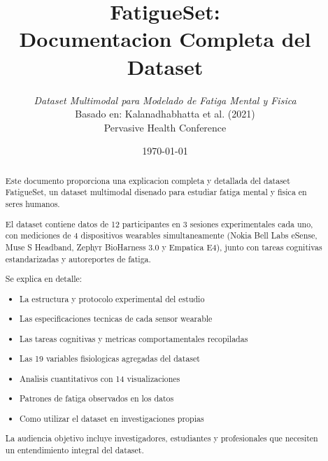 \documentclass[12pt, a4paper, oneside, openany]{report}
\title{\Huge \textbf{FatigueSet:\\Documentacion Completa del Dataset}}
\author{\textit{Dataset Multimodal para Modelado de Fatiga Mental y Fisica}\\[0.5cm]
        \small{Basado en: Kalanadhabhatta et al. (2021)\\
        Pervasive Health Conference}
        }
\date{\today}
\begin{document}
\maketitle

\begin{abstract}
\noindent
Este documento proporciona una explicacion completa y detallada del dataset FatigueSet,
un dataset multimodal disenado para estudiar fatiga mental y fisica en seres humanos.

El dataset contiene datos de 12 participantes en 3 sesiones experimentales cada uno,
con mediciones de 4 dispositivos wearables simultaneamente (Nokia Bell Labs eSense,
Muse S Headband, Zephyr BioHarness 3.0 y Empatica E4), junto con tareas cognitivas
estandarizadas y autoreportes de fatiga.

Se explica en detalle:
\begin{itemize}
    \item La estructura y protocolo experimental del estudio
    \item Las especificaciones tecnicas de cada sensor wearable
    \item Las tareas cognitivas y metricas comportamentales recopiladas
    \item Las 19 variables fisiologicas agregadas del dataset
    \item Analisis cuantitativos con 14 visualizaciones
    \item Patrones de fatiga observados en los datos
    \item Como utilizar el dataset en investigaciones propias
\end{itemize}

La audiencia objetivo incluye investigadores, estudiantes y profesionales
que necesiten un entendimiento integral del dataset.
\end{abstract}

\newpage

\tableofcontents

\newpage










\end{document}
